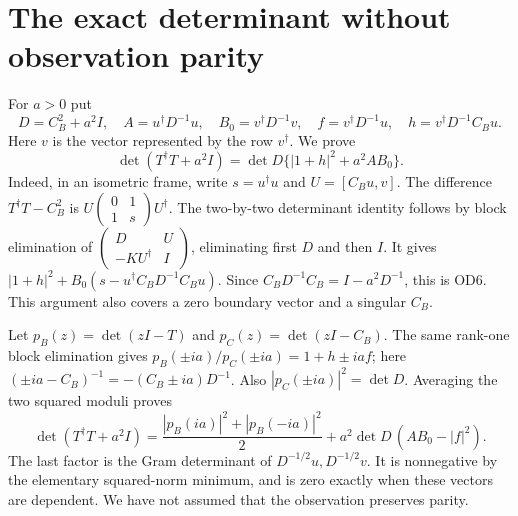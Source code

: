 \documentclass[11pt]{article}
\begin{document}
\section{The exact determinant without observation parity}
For $a>0$ put
\begin{equation}\tag{OD5}
 D=C_B^2+a^2I,\quad A=u^\dagger D^{-1}u,\quad
 B_0=v^\dagger D^{-1}v,\quad f=v^\dagger D^{-1}u,\quad
 h=v^\dagger D^{-1}C_Bu.
\end{equation}
Here $v$ is the vector represented by the row $v^\dagger$. We prove
\begin{equation}\tag{OD6}
 \det(T^\dagger T+a^2I)=\det D\{|1+h|^2+a^2AB_0\}.
\end{equation}
Indeed, in an isometric frame, write $s=u^\dagger u$ and
$U=[C_Bu,v]$. The difference $T^\dagger T-C_B^2$ is
$U\left(\begin{smallmatrix}0&1\\1&s\end{smallmatrix}\right)U^\dagger$.
The two-by-two determinant identity follows by block elimination of
$\left(\begin{smallmatrix}D&U\\-KU^\dagger&I\end{smallmatrix}\right)$,
eliminating first $D$ and then $I$. It gives
$|1+h|^2+B_0(s-u^\dagger C_BD^{-1}C_Bu)$.
Since $C_BD^{-1}C_B=I-a^2D^{-1}$, this is OD6. This argument also
covers a zero boundary vector and a singular $C_B$.

Let $p_B(z)=\det(zI-T)$ and $p_C(z)=\det(zI-C_B)$. The same
rank-one block elimination gives
$p_B(\pm ia)/p_C(\pm ia)=1+h\pm iaf$; here
$(\pm ia-C_B)^{-1}=-(C_B\pm ia)D^{-1}$. Also
$|p_C(\pm ia)|^2=\det D$. Averaging the two squared moduli proves
\begin{equation}\tag{OD7}
 \boxed{\det(T^\dagger T+a^2I)=
 \frac{|p_B(ia)|^2+|p_B(-ia)|^2}{2}
 +a^2\det D\,(AB_0-|f|^2).}
\end{equation}
The last factor is the Gram determinant of $D^{-1/2}u,D^{-1/2}v$.
It is nonnegative by the elementary squared-norm minimum, and is zero
exactly when these vectors are dependent. We have not assumed that the
observation preserves parity.
\end{document}

